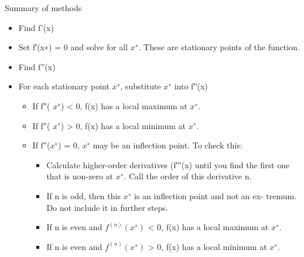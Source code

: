 \documentclass[
  ignorenonframetext,
]{beamer}
\providecommand{\tightlist}{%
  \setlength{\itemsep}{0pt}\setlength{\parskip}{0pt}}
\begin{document}
\begin{frame}{Summary of methods}
\protect\hypertarget{summary-of-methods}{}

\begin{itemize}
\item
  Find f'(x)
\item
  Set f′(x∗) = 0 and solve for all \(x^{∗}\). These are stationary
  points of the function.
\item
  Find f''(x)
\item
  For each stationary point \(x^{∗}\), substitute \(x^{∗}\) into f′′(x)

  \begin{itemize}
  \item
    If f′′( \(x^{∗}\)) \textless{} 0, f(x) has a local maximum at
    \(x^{∗}\).
  \item
    If f′′( \(x^{∗}\)) \textgreater{} 0, f(x) has a local minimum at
    \(x^{∗}\).
  \item
    If f′′(\(x^{∗}\)) = 0, \(x^{∗}\) may be an inflection point. To
    check this:

    \begin{itemize}
    \tightlist
    \item
      Calculate higher-order derivatives (f′′′(x) until you find the
      first one that is non-zero at \(x^{∗}\). Call the order of this
      derivative n.
    \item
      If n is odd, then this \(x^{∗}\) is an inflection point and not an
      ex- tremum. Do not include it in further steps.
    \item
      If n is even and \(f^{(n)}(x^{∗})\) \textless{} 0, f(x) has a
      local maximum at \(x^{∗}\).
    \item
      If n is even and \(f^{(n)}(x^{∗})\) \textgreater{} 0, f(x) has a
      local minimum at \(x^{∗}\).
    \end{itemize}
  \end{itemize}
\end{itemize}

\end{frame}
\end{document}
